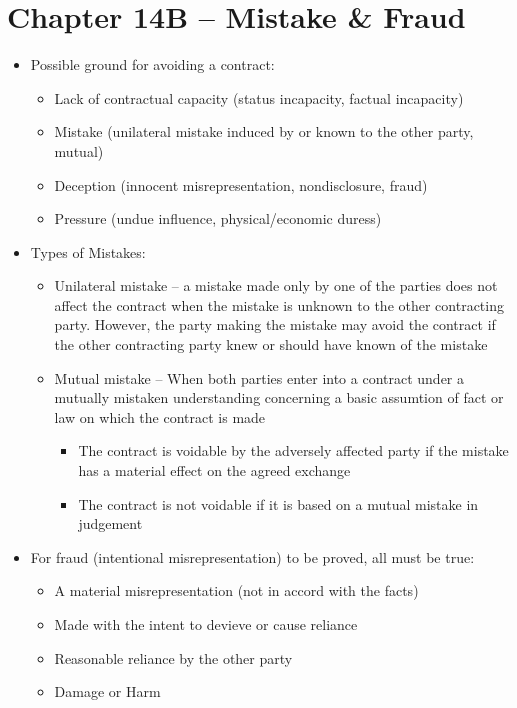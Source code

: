 \documentclass{article}
\begin{document}
	\section{Chapter 14B -- Mistake \& Fraud}
	\begin{itemize}
		\item Possible ground for avoiding a contract:
		\begin{itemize}
			\item Lack of contractual capacity (status incapacity, factual incapacity)
			\item Mistake (unilateral mistake induced by or known to the other party, mutual)
			\item Deception (innocent misrepresentation, nondisclosure, fraud)
			\item Pressure (undue influence, physical/economic duress)
		\end{itemize}
		\item Types of Mistakes:			
		\begin{itemize}
			\item Unilateral mistake -- a mistake made only by one of the parties does not affect the contract when the mistake is unknown to the other contracting party. However, the party making the mistake may avoid the contract if the other contracting party knew or should have known of the mistake
			\item Mutual mistake -- When both parties enter into a contract under a mutually mistaken understanding concerning a basic assumtion of fact or law on which the contract is made
			\begin{itemize}
				\item The contract is voidable by the adversely affected party if the mistake has a material effect on the agreed exchange
				\item The contract is not voidable if it is based on a mutual mistake in judgement
			\end{itemize}
		\end{itemize}
		\item For fraud (intentional misrepresentation) to be proved, all must be true:
		\begin{itemize}
			\item A material misrepresentation (not in accord with the facts)
			\item Made with the intent to devieve or cause reliance
			\item Reasonable reliance by the other party
			\item Damage or Harm

\end{itemize}
\end{itemize}
\end{document}
